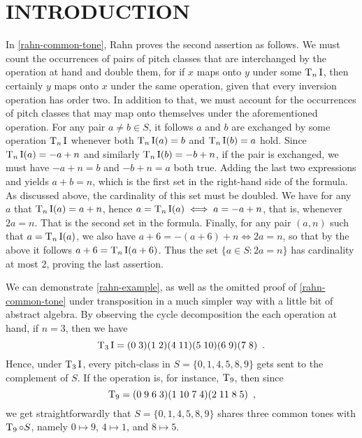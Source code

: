 \chapter{INTRODUCTION}

In \ref{rahn-common-tone}, Rahn proves the second assertion as follows. We must count the occurrences of pairs of pitch classes that are interchanged by the operation at
hand and double them, for if $x$ maps onto $y$ under some $\operatorname{T}_n\operatorname{I}$, then certainly
$y$ maps onto $x$ under the same operation, given that every inversion operation
has order two. In addition to that, we must account for the occurrences of pitch
classes that may map onto themselves under the aforementioned operation. For any
pair $a \ne b \in S$, it follows $a$ and $b$ are exchanged by some operation
$\operatorname{T}_n\operatorname{I}$ whenever both $\operatorname{T}_n\operatorname{I}(a) = b$ and $\operatorname{T}_n\operatorname{I}(b) = a$ hold. Since
$\operatorname{T}_n\operatorname{I}(a) = -a + n$ and similarly $\operatorname{T}_n\operatorname{I}(b) = -b + n$, if the pair is exchanged,
we must have $-a + n = b$ and $-b + n = a$ both true. Adding the last two
expressions and yields $a + b = n$, which is the first set in the right-hand side
of the formula. As discussed above, the cardinality of this set must be doubled.
We have for any $a$ that $\operatorname{T}_n\operatorname{I}(a) = a + n$, hence $a = \operatorname{T}_n\operatorname{I}(a) \iff a = -a + n$,
that is, whenever $2a = n$. That is the second set in the formula. Finally,
for any pair $(a, n)$ such that $a = \operatorname{T}_n\operatorname{I}(a)$, we also have
$a + 6 = -(a + 6) + n \iff 2a = n$, so that by the above it follows
$a + 6 = \operatorname{T}_n\operatorname{I}(a + 6)$. Thus the set $\{a \in S : 2a = n\}$ has cardinality
at most 2, proving the last assertion.

We can demonstrate \ref{rahn-example}, as well as the omitted proof of \ref{rahn-common-tone} under transposition in a much simpler way with a little bit of abstract algebra. By observing
the cycle decomposition the each operation at hand, if $n = 3$, then we have
\begin{equation}
	\operatorname{T}_3\operatorname{I} = (0 \; 3) (1 \; 2) (4 \; 11) (5 \; 10) (6 \; 9) (7 \; 8) \enspace.
\end{equation}
Hence, under $\operatorname{T}_3\operatorname{I}$, every pitch-class in $S = \{ 0, 1, 4, 5, 8, 9 \}$ gets sent to the
complement of $S$. If the operation is, for instance, $\operatorname{T}_9$, then since
\begin{equation}
	\operatorname{T}_9 = (0 \; 9 \; 6 \; 3) (1 \; 10 \; 7 \; 4) (2 \; 11 \; 8 \; 5) \enspace,
\end{equation}
we get straightforwardly that $S = \{ 0, 1, 4, 5, 8, 9 \}$ shares three common tones with
$\operatorname{T}_9 \circ S$, namely $0 \mapsto 9$, $4 \mapsto 1$, and $8 \mapsto 5$.

